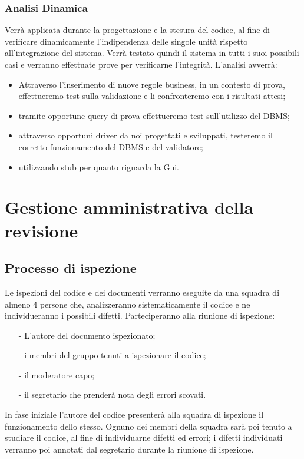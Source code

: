 \subsection{Analisi Dinamica}
Verr\`a applicata durante la progettazione e la stesura del codice, al fine di verificare dinamicamente l'indipendenza delle singole unit\`a rispetto all'integrazione del sistema. Verr\`a testato quindi il sistema in tutti i suoi possibili casi e verranno effettuate prove per verificarne l'integrit\`a. L'analisi avverr\`a:
\begin{itemize}
\item Attraverso l'inserimento di nuove regole business, in un contesto di prova, effettueremo test sulla validazione e li confronteremo con i risultati attesi;
\item tramite opportune query di prova effettueremo test sull'utilizzo del DBMS;
\item attraverso opportuni driver da noi progettati e sviluppati, testeremo il corretto funzionamento del DBMS e del validatore;
\item utilizzando stub per quanto riguarda la Gui. 
\end{itemize}

\chapter[Gestione revisione]{Gestione amministrativa della revisione} 
\section{Processo di ispezione}
Le ispezioni del codice e dei documenti verranno eseguite da una squadra di almeno 4 persone che, analizzeranno sistematicamente il codice e ne individueranno i possibili difetti. Parteciperanno alla riunione di ispezione: 
\begin{itemize}
\item[-]L'autore del documento ispezionato;
\item[-]i membri del gruppo tenuti a ispezionare il codice;
\item[-]il moderatore capo;
\item[-]il segretario che prender\`a nota degli errori scovati.
\end{itemize}
In fase iniziale l'autore del codice presenter\`a alla squadra di ispezione il funzionamento dello stesso. Ognuno dei membri della squadra sar\`a poi tenuto a studiare il codice, al fine di individuarne difetti ed errori; i difetti individuati verranno poi annotati dal segretario durante la riunione di ispezione. 
